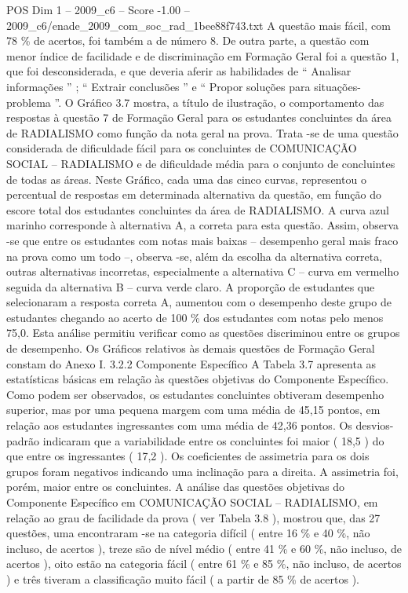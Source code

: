 \begin{textsample}{POS Dim 1 – 2009\_c6 – Score -1.00 – 2009\_c6/enade\_2009\_com\_soc\_rad\_1bee88f743.txt}
A questão mais fácil, com 78 \% de acertos, foi também a de número 8.
De outra parte, a questão com menor índice de facilidade e de discriminação em Formação Geral foi a questão 1, que foi desconsiderada, e que deveria aferir as habilidades de “ Analisar informações ” ; “ Extrair conclusões ” e “ Propor soluções para situações-problema ”.
O Gráfico 3.7 mostra, a título de ilustração, o comportamento das respostas à questão 7 de Formação Geral para os estudantes concluintes da área de RADIALISMO como função da nota geral na prova.
Trata -se de uma questão considerada de dificuldade fácil para os concluintes de COMUNICAÇÃO SOCIAL – RADIALISMO e de dificuldade média para o conjunto de concluintes de todas as áreas.
Neste Gráfico, cada uma das cinco curvas, representou o percentual de respostas em determinada alternativa da questão, em função do escore total dos estudantes concluintes da área de RADIALISMO.
A curva azul marinho corresponde à alternativa A, a correta para esta questão.
Assim, observa -se que entre os estudantes com notas mais baixas – desempenho geral mais fraco na prova como um todo –, observa -se, além da escolha da alternativa correta, outras alternativas incorretas, especialmente a alternativa C – curva em vermelho seguida da alternativa B – curva verde claro.
A proporção de estudantes que selecionaram a resposta correta A, aumentou com o desempenho deste grupo de estudantes chegando ao acerto de 100 \% dos estudantes com notas pelo menos 75,0.
Esta análise permitiu verificar como as questões discriminou entre os grupos de desempenho.
Os Gráficos relativos às demais questões de Formação Geral constam do Anexo I. 3.2.2 Componente Específico A Tabela 3.7 apresenta as estatísticas básicas em relação às questões objetivas do Componente Específico.
Como podem ser observados, os estudantes concluintes obtiveram desempenho superior, mas por uma pequena margem com uma média de 45,15 pontos, em relação aos estudantes ingressantes com uma média de 42,36 pontos.
Os desvios-padrão indicaram que a variabilidade entre os concluintes foi maior ( 18,5 ) do que entre os ingressantes ( 17,2 ).
Os coeficientes de assimetria para os dois grupos foram negativos indicando uma inclinação para a direita.
A assimetria foi, porém, maior entre os concluintes.
A análise das questões objetivas do Componente Específico em COMUNICAÇÃO SOCIAL – RADIALISMO, em relação ao grau de facilidade da prova ( ver Tabela 3.8 ), mostrou que, das 27 questões, uma encontraram -se na categoria difícil ( entre 16 \% e 40 \%, não incluso, de acertos ), treze são de nível médio ( entre 41 \% e 60 \%, não incluso, de acertos ), oito estão na categoria fácil ( entre 61 \% e 85 \%, não incluso, de acertos ) e três tiveram a classificação muito fácil ( a partir de 85 \% de acertos ).

\end{textsample}
